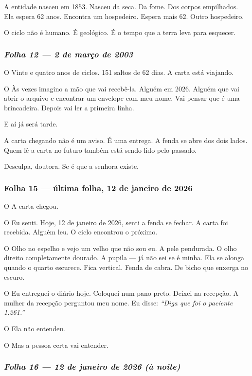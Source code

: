 \noindent A entidade nasceu em 1853. Nasceu da seca. Da fome. Dos corpos empilhados. Ela espera 62 anos. Encontra um hospedeiro. Espera mais 62. Outro hospedeiro.

\noindent O ciclo não é humano. É geológico. É o tempo que a terra leva para esquecer.

\subsubsection*{\textit{Folha 12 --- 2 de março de 2003}}

\noindent O Vinte e quatro anos de ciclos. 151 saltos de 62 dias. A carta está viajando.

\noindent O Às vezes imagino a mão que vai recebê-la. Alguém em 2026. Alguém que vai abrir o arquivo e encontrar um envelope com meu nome. Vai pensar que é uma brincadeira. Depois vai ler a primeira linha.

\noindent E aí já será tarde.

\noindent A carta chegando não é um aviso. É uma entrega. A fenda se abre dos dois lados. Quem lê a carta no futuro também está sendo lido pelo passado.

\noindent Desculpa, doutora. Se é que a senhora existe.

\subsubsection*{Folha 15 --- última folha, 12 de janeiro de 2026}

\noindent O A carta chegou.

\noindent O Eu senti. Hoje, 12 de janeiro de 2026, senti a fenda se fechar. A carta foi recebida. Alguém leu. O ciclo encontrou o próximo.

\noindent O Olho no espelho e vejo um velho que não sou eu. A pele pendurada. O olho direito completamente dourado. A pupila --- já não sei se é minha. Ela se alonga quando o quarto escurece. Fica vertical. Fenda de cabra. De bicho que enxerga no escuro.

\noindent O Eu entreguei o diário hoje. Coloquei num pano preto. Deixei na recepção. A mulher da recepção perguntou meu nome. Eu disse: \textit{\textquotedblleft{}Diga que foi o paciente 1.261.\textquotedblright{}}

\noindent O Ela não entendeu.

\noindent O Mas a pessoa certa vai entender.

\subsubsection*{\textit{Folha 16 --- 12 de janeiro de 2026 (à noite)}}

